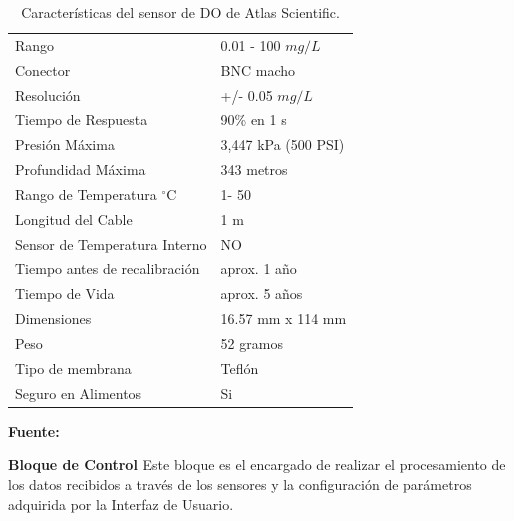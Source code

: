 \begin{table}[H]
\protect\caption[Caracter\'isticas del sensor de DO de Atlas Scientific]{Caracter\'isticas del sensor de DO de Atlas Scientific.}
\label{tab:caract_do}
\begin{center}
\begin{tabular}{l l}
\hline
Rango   &  0.01 - 100     $mg/L$         \\
Conector &  BNC macho                       \\
Resolución   &  +/-      0.05 $ mg/L$              \\
Tiempo de Respuesta   &  90\% en 1 s         \\
Presión Máxima    &  3,447 kPa (500 PSI)    \\
Profundidad Máxima	& 343 metros            \\
Rango de Temperatura $^{\circ}$C	& 1- 50\\
Longitud del Cable	& 1 m                    \\
Sensor de Temperatura Interno	& NO        \\
Tiempo antes de recalibración	& aprox. 1 año    \\
Tiempo de Vida	& aprox. 5 años            \\
Dimensiones	& 16.57 mm x 114 mm                  \\
Peso	& 52 gramos                         \\
Tipo de membrana	& Tefl\'on           \\
Seguro en Alimentos	& Si                    \\
\hline
\end{tabular}
\vspace{5mm}
\newline
\hfill \textbf{Fuente:} \cite{atlas_dissolved_DO}
\end{center}
\end{table}

\textbf{Bloque de Control}
Este bloque es el encargado de realizar el procesamiento de los datos recibidos a través de los sensores y la configuración de parámetros adquirida por la Interfaz de Usuario.

